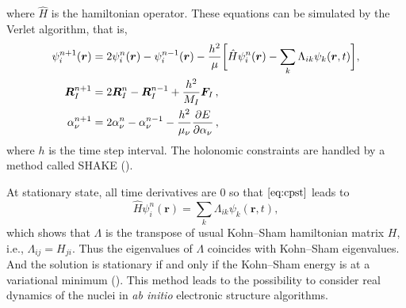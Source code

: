 where $\hat{H}$ is the hamiltonian operator.
These equations can be simulated by the Verlet algorithm, that is,
\begin{subequations}
	\label{eq:cpeqm}
	\begin{align}
		\psi_i ^{n+1} (\bm{r}) & = 2 \psi_{i} ^ {n} (\bm{r}) -
		\psi_i ^{n-1} (\bm{r}) - \frac{ h^2 }{ \mu }
		\bigg[
			\hat{H} \psi_{i} ^ {n} (\bm{r}) - \sum_{k}
			\Lambda_{ik} \psi_k (\bm{r}, t)
		\bigg],\label{eq:cpst}                                           \\
		\bm{R}_{I}^{n+1}       & = 2 \bm{R}_{I}^{n} - \bm{R}_{I}^{n-1} +
		\frac{ h^2 }{ M_I } \bm{F}_{I} \thinspace,                       \\
		\alpha_{\nu}^{n+1}     & = 2 \alpha_{\nu}^{n} -
		\alpha_{\nu}^{n-1} -
		\frac{ h^2 }{ \mu_{\nu} }
		\frac{ \partial E }{ \partial \alpha_{\nu} } \thinspace,
	\end{align}
\end{subequations}
where $h$ is the time step interval. The holonomic constraints are
handled by a method called SHAKE (\cite{Ryckaert:1977gp}).

At stationary state, all time derivatives are $0$ so that
$\eqref{eq:cpst}$ leads to
\begin{equation}
	\hat{H} \psi_{i} ^ {n} (\bm{r}) = \sum_{k}
	\Lambda_{ik} \psi_k (\bm{r}, t),
\end{equation}
which shows that $\Lambda$ is the transpose of
usual Kohn--Sham hamiltonian matrix
$H$, i.e., $\Lambda_{ij} = H_{ji}$. Thus the eigenvalues of
$\Lambda$ coincides with Kohn--Sham eigenvalues.
And the solution is stationary if and only if the Kohn--Sham
energy is at a variational minimum (\cite{martin2004electronic}).
This method leads to the possibility to consider real dynamics
of the nuclei in \textit{ab initio} electronic structure algorithms.

%
%
